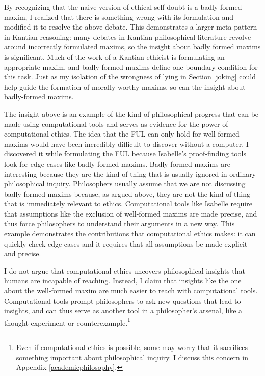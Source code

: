 \begin{isabellebody}
\begin{isamarkuptext}
By recognizing that the naive version of ethical self-doubt is a badly formed maxim, I realized 
that there is something wrong with its formulation and modified it to resolve the above debate. 
This demonstrates a larger meta-pattern in Kantian reasoning: many debates in Kantian philosophical
literature revolve around incorrectly formulated maxims, so the insight about badly
formed maxims is significant. Much of the work of a Kantian ethicist is formulating an
appropriate maxim, and badly-formed maxims define one boundary condition for this task. Just as my isolation
of the wrongness of lying in Section \ref{joking} could help guide the formation of morally worthy maxims, 
so can the insight about badly-formed maxims.%
\end{isamarkuptext}\isamarkuptrue%
%
\isadelimdocument
%
\endisadelimdocument
%
\isatagdocument
%
\isamarkuptrue%
%
\endisatagdocument
{\isafolddocument}%
%
\isadelimdocument
%
\endisadelimdocument
%
\begin{isamarkuptext}%
The insight above is an example of the kind of philosophical progress that can be 
made using computational tools and serves as evidence for the power of computational ethics. The 
idea that the FUL can only hold for well-formed maxims would have been
incredibly difficult to discover without a computer. I discovered it while formulating the FUL because 
Isabelle's proof-finding tools look for edge cases like badly-formed maxims. Badly-formed maxims are 
interesting because they are the kind of thing that is usually ignored in ordinary philosophical inquiry. 
Philosophers usually assume that we are not discussing badly-formed maxims because, as argued above, 
they are not the kind of thing that is immediately relevant to ethics. Computational tools like Isabelle
require that assumptions like the exclusion of well-formed maxims are made precise, and thus force 
philosophers to understand their arguments in a new way. This example demonstrates the contributions
that computational ethics makes: it can quickly check edge cases and it requires that all assumptions be
made explicit and precise.

I do not argue that computational ethics uncovers philosophical insights that humans are incapable 
of reaching. Instead, I claim that insights like the one about the well-formed maxim are much easier
to reach with computational tools. Computational 
tools prompt philosophers to ask new questions that 
lead to insights, and can thus serve as another tool in a philosopher's arsenal, like a 
thought experiment or counterexample.\footnote{Even if computational ethics is possible, some may 
worry that it sacrifices something important about philosophical inquiry. I discuss this concern in Appendix 
\ref{academicphilosophy}.}


\end{isamarkuptext}
\end{isabellebody}
